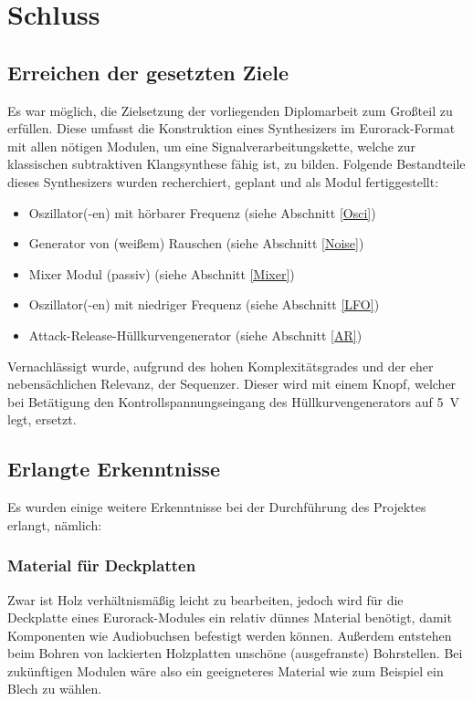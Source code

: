 \chapter{Schluss}

\section{Erreichen der gesetzten Ziele}
\label{sec:org1b9b42b}
Es war möglich, die Zielsetzung der vorliegenden Diplomarbeit zum Großteil zu erfüllen. Diese umfasst die Konstruktion eines Synthesizers im Eurorack-Format mit allen nötigen Modulen, um eine Signalverarbeitungskette, welche zur klassischen subtraktiven Klangsynthese fähig ist, zu bilden. Folgende Bestandteile dieses Synthesizers wurden recherchiert, geplant und als Modul fertiggestellt:

\begin{itemize}
\item Oszillator(-en) mit hörbarer Frequenz (siehe Abschnitt \ref{Osci})
\item Generator von (weißem) Rauschen (siehe Abschnitt \ref{Noise})
\item Mixer Modul (passiv) (siehe Abschnitt \ref{Mixer})
\item Oszillator(-en) mit niedriger Frequenz (siehe Abschnitt \ref{LFO})
\item Attack-Release-Hüllkurvengenerator (siehe Abschnitt \ref{AR})
\end{itemize}

Vernachlässigt wurde, aufgrund des hohen Komplexitätsgrades und der eher nebensächlichen Relevanz, der Sequenzer. Dieser wird mit einem Knopf, welcher bei Betätigung den Kontrollspannungseingang des Hüllkurvengenerators auf \SI{5}{\volt} legt, ersetzt.

\section{Erlangte Erkenntnisse}
\label{sec:org37d4a5d}
Es wurden einige weitere Erkenntnisse bei der Durchführung des Projektes erlangt, nämlich:

\subsection{Material für Deckplatten}
\label{sec:org6d5be18}
Zwar ist Holz verhältnismäßig leicht zu bearbeiten, jedoch wird für die Deckplatte eines Eurorack-Modules ein relativ dünnes Material benötigt, damit Komponenten wie Audiobuchsen befestigt werden können. Außerdem entstehen beim Bohren von lackierten Holzplatten unschöne (ausgefranste) Bohrstellen. Bei zukünftigen Modulen wäre also ein geeigneteres Material wie zum Beispiel ein Blech zu wählen.


